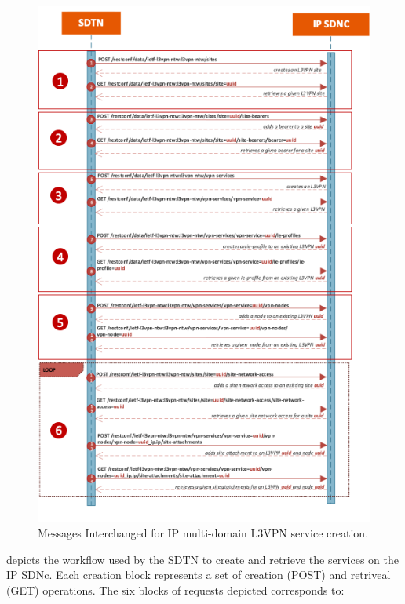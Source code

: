 \documentclass[a4paper,fleqn]{cas-dc}
\begin{document}
\begin{figure}
	\centering
		\includegraphics[width=\linewidth]{figs/l3vpn_workflow_4.png}
	\caption{Messages Interchanged for IP multi-domain L3VPN service creation.}
	\label{FIG:l3vpn_workflow}
\end{figure}

 depicts the workflow used by the SDTN to create and retrieve the services on the IP SDNc. Each creation block represents a set of  creation (POST) and retriveal (GET) operations. The six blocks of requests depicted corresponds to: 
\end{document}
